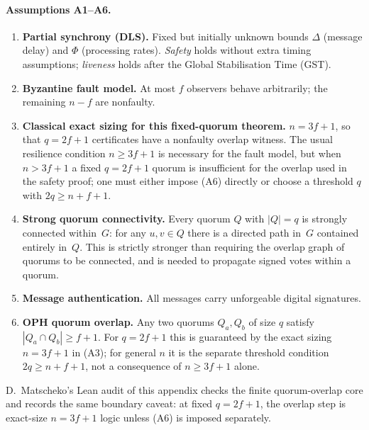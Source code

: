 \paragraph{Assumptions A1--A6.}
\begin{enumerate}[(A1)]
  \item \textbf{Partial synchrony (DLS).}
        Fixed but initially unknown bounds $\Delta$ (message delay) and
        $\Phi$ (processing rates).
        \emph{Safety} holds without extra timing assumptions;
        \emph{liveness} holds after the Global Stabilisation Time (\textrm{GST}).
  \item \textbf{Byzantine fault model.}
        At most $f$ observers behave arbitrarily; the remaining $n-f$ are nonfaulty.
  \item \textbf{Classical exact sizing for this fixed-quorum theorem.}
        $n = 3f+1$, so that $q=2f+1$ certificates have a nonfaulty overlap
        witness.  The usual resilience condition $n\ge 3f+1$ is necessary for
        the fault model, but when $n>3f+1$ a fixed $q=2f+1$ quorum is
        insufficient for the overlap used in the safety proof; one must either
        impose (A6) directly or choose a threshold $q$ with
        $2q\ge n+f+1$.
  \item \textbf{Strong quorum connectivity.}
        Every quorum $Q$ with $|Q|=q$ is strongly connected within~$G$:
        for any $u,v\in Q$ there is a directed path in~$G$ contained
        entirely in~$Q$.
        This is strictly stronger than requiring the overlap graph of
        quorums to be connected, and is needed to propagate signed votes
        within a quorum.
  \item \textbf{Message authentication.}
        All messages carry unforgeable digital signatures.
  \item \textbf{OPH quorum overlap.}
        Any two quorums $Q_a, Q_b$ of size $q$ satisfy
        $|Q_a\cap Q_b|\geq f+1$.  For $q=2f+1$ this is guaranteed by the
        exact sizing $n=3f+1$ in (A3); for general $n$ it is the separate
        threshold condition $2q\ge n+f+1$, not a consequence of
        $n\ge3f+1$ alone.
\end{enumerate}

D.\ Matscheko's Lean audit of this appendix checks the finite quorum-overlap
core and records the same boundary caveat: at fixed \(q=2f+1\), the overlap
step is exact-size \(n=3f+1\) logic unless (A6) is imposed separately.

